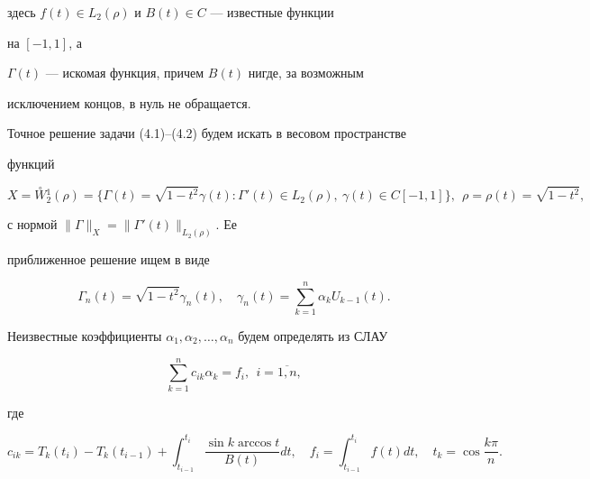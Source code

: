 здесь $f(t)\in L_2(\rho)$ и $B(t)\in C$ --- известные функции


на $[-1,1]$, а


$\Gamma(t)$ --- искомая функция, причем $B(t)$ нигде, за возможным


исключением концов, в нуль не обращается.





Точное решение задачи (4.1)--(4.2) будем искать в весовом пространстве


функций


$$


X=\overset{\circ}{W}{}_{2}^{1}(\rho)=\big\{


\Gamma(t)=\sqrt{1-t^2}\gamma(t):\Gamma'(t)\in L_2(\rho),


\ \gamma(t)\in C[-1,1]\big\},\ \


\rho=\rho(t)=\sqrt{1-t^2},


$$


с нормой $\|\Gamma\|_X=\|\Gamma'(t)\|_{L_2(\rho)}$. Ее


приближенное решение ищем в виде


\begin{equation}


\Gamma_n(t)=\sqrt{1-t^2}\gamma_n(t),\quad


\gamma_n(t)=\sum_{k=1}^{n}\alpha_kU_{k-1}(t).


\end{equation}


Неизвестные коэффициенты $\alpha_1,\alpha_2,\dotsc,


\alpha_n$ будем определять из СЛАУ


\begin{equation}


\sum_{k=1}^{n}c_{ik}\alpha_k=f_i,\ \ i=\overline{1,n},


\end{equation}


где


\begin{equation}


c_{ik}=T_k(t_i)-T_k(t_{i-1})+


\int_{t_{i-1}}^{t_i}\frac{\sin k \arccos t}{B(t)}dt,\quad


f_i=\int_{t_{i-1}}^{t_i}f(t)dt,\quad t_k=\cos\frac{k\pi}{n}.


\end{equation}





